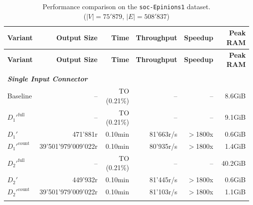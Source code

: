 \begin{longtable}{lrrrrr}
    
    \caption[soc-Epinions1 Performance Comparison]{Performance comparison on the \texttt{soc-Epinions1} dataset. \\ ($|V| = 75'879$, $|E| = 508'837$)}
    \label{tab:results_soc-Epinions1} \\

    \toprule
    \textbf{Variant}      & \textbf{Output Size}  & \textbf{Time}       & \textbf{Throughput}   & \textbf{Speedup}  & \textbf{Peak RAM} \\
    \midrule
    \endfirsthead 

    \toprule
    \textbf{Variant}      & \textbf{Output Size}  & \textbf{Time}       & \textbf{Throughput}   & \textbf{Speedup}  & \textbf{Peak RAM} \\
    \midrule
    \endhead 

    \bottomrule
    \endfoot  

    \endlastfoot 

    
    \multicolumn{6}{l}{\textit{5 Path Query}} \\
    \midrule
    \multicolumn{6}{l}{\textit{\textbf{Single Input Connector}}} \\
    \nopagebreak
    Baseline              &  --                   &  TO (0.21\%)    &  --                  & --                & 8.6GiB    \\
    $D_1'^{\text{full}}$   &  --                   &  TO (0.21\%)    &  --                  & --                & 9.1GiB    \\
    \quad $D_1'$           &  471'881r             &  0.10min        &  81'663r/s           & $>$1800x           & 0.6GiB    \\
    $D_1'^{\text{count}}$  &  39'501'979'009'022r  &  0.10min        &  80'935r/s           & $>$1800x           & 1.4GiB    \\
    $D_2'^{\text{full}}$   &  --                   &  TO (0.21\%)    &  --                  & --                & 40.2GiB   \\
    \quad $D_2'$           &  449'932r             &  0.10min        &  81'445r/s           & $>$1800x           & 0.6GiB    \\
    $D_2'^{\text{count}}$  &  39'501'979'009'022r  &  0.10min        &  81'103r/s           & $>$1800x           & 1.1GiB    \\
    \addlinespace
    

\end{longtable}
